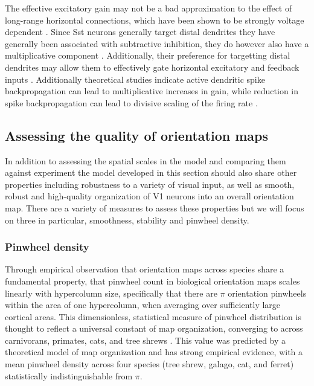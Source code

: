 The effective excitatory gain may not be a bad approximation to the
effect of long-range horizontal connections, which have been shown to
be strongly voltage dependent \citep{Hirsch1991}. Since Sst neurons
generally target distal dendrites they have generally been associated
with subtractive inhibition, they do however also have a
multiplicative component \citep{Wilson2012}. Additionally, their
preference for targetting distal dendrites may allow them to
effectively gate horizontal excitatory and feedback inputs
\citep{Ma2011, Gentet2012}. Additionally theoretical studies indicate
active dendritic spike backpropagation can lead to multiplicative
increases in gain, while reduction in spike backpropagation can lead
to divisive scaling of the firing rate \citep{Mehaffey2005}.

\subsection{Assessing the quality of orientation maps}

In addition to assessing the spatial scales in the model and comparing
them against experiment the model developed in this section should
also share other properties including robustness to a variety of
visual input, as well as smooth, robust and high-quality organization
of V1 neurons into an overall orientation map. There are a variety of
measures to assess these properties but we will focus on three in
particular, smoothness, stability and pinwheel density.

\subsubsection{Pinwheel density}

Through empirical observation that orientation maps across species
share a fundamental property, that pinwheel count in biological
orientation maps scales linearly with hypercolumn size, specifically
that there are $\pi$ orientation pinwheels within the area of one
hypercolumn, when averaging over sufficiently large cortical
areas. This dimensionless, statistical measure of pinwheel
distribution is thought to reflect a universal constant of map
organization, converging to across carnivorans, primates, cats, and
tree shrews \citep{Kaschube2010, Keil2012}. This value was predicted
by a theoretical model of map organization and has strong empirical
evidence, with a mean pinwheel density across four species (tree
shrew, galago, cat, and ferret) statistically indistinguishable from
$\pi$.

